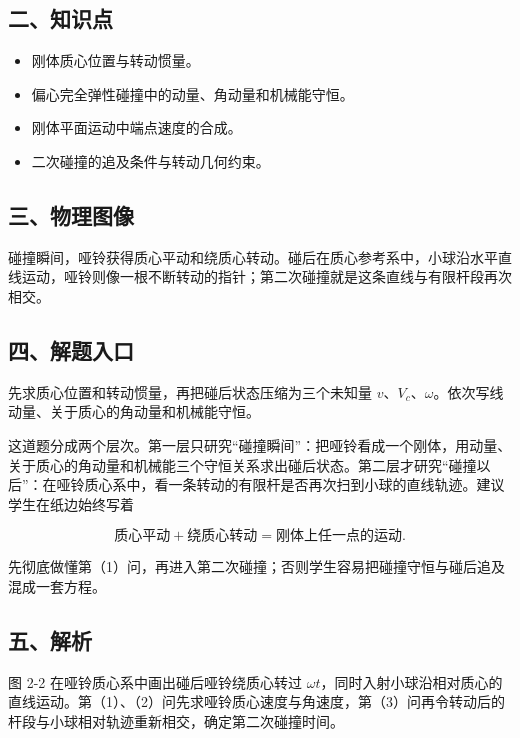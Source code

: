 \documentclass[12pt,a4paper,UTF8]{ctexart}
\newcommand{\tightlist}{\setlength{\itemsep}{0pt}\setlength{\parskip}{0pt}}
\begin{document}
\subsection{二、知识点}\label{ux4e8cux77e5ux8bc6ux70b9-1}

\begin{itemize}
\tightlist
\item
  刚体质心位置与转动惯量。
\item
  偏心完全弹性碰撞中的动量、角动量和机械能守恒。
\item
  刚体平面运动中端点速度的合成。
\item
  二次碰撞的追及条件与转动几何约束。
\end{itemize}

\subsection{三、物理图像}\label{ux4e09ux7269ux7406ux56feux50cf-1}

碰撞瞬间，哑铃获得质心平动和绕质心转动。碰后在质心参考系中，小球沿水平直线运动，哑铃则像一根不断转动的指针；第二次碰撞就是这条直线与有限杆段再次相交。

\subsection{四、解题入口}\label{ux56dbux89e3ux9898ux5165ux53e3-1}

先求质心位置和转动惯量，再把碰后状态压缩为三个未知量
\(v\)、\(V_c\)、\(\omega\)。依次写线动量、关于质心的角动量和机械能守恒。

这道题分成两个层次。第一层只研究``碰撞瞬间''：把哑铃看成一个刚体，用动量、关于质心的角动量和机械能三个守恒关系求出碰后状态。第二层才研究``碰撞以后''：在哑铃质心系中，看一条转动的有限杆是否再次扫到小球的直线轨迹。建议学生在纸边始终写着

\[\text{质心平动}+\text{绕质心转动}=\text{刚体上任一点的运动}.\]

先彻底做懂第（1）问，再进入第二次碰撞；否则学生容易把碰撞守恒与碰后追及混成一套方程。

\subsection{五、解析}\label{ux4e94ux89e3ux6790-1}

图 2-2 在哑铃质心系中画出碰后哑铃绕质心转过
\(\omega t\)，同时入射小球沿相对质心的直线运动。第（1）、（2）问先求哑铃质心速度与角速度，第（3）问再令转动后的杆段与小球相对轨迹重新相交，确定第二次碰撞时间。
\end{document}
